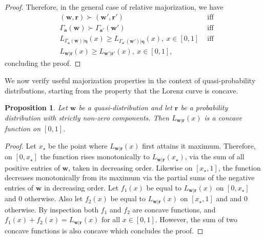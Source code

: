 \documentclass[
twocolumn,
superscriptaddress
]{revtex4-1}
\newtheorem{proposition}[theorem]{Proposition}
\def\bmeta{\boldsymbol{\eta}}
\def\bma{\boldsymbol{a}}
\def\r{\boldsymbol{r}}
\def\w{\boldsymbol{w}}
\begin{document}
{\begin{proof}
Therefore, in the general case of relative majorization, we have
\begin{align}
	&(\w, \r) \succ (\w', \r') &\mbox{ iff} \nonumber\\
	&\Gamma_{\bma} (\w) \succ \Gamma_{\bma'} (\w') &\mbox{ iff} \nonumber\\
	&L_{\Gamma_{\bma} (\w) | \bmeta}(x) \geq L_{\Gamma_{\bma'} (\w') | \bmeta}(x),\ x \in [0,1] &\mbox{ iff} \nonumber\\
	&L_{\w | \r}(x) \geq L_{\w' | \r'}(x),\ x \in [0,1],
\end{align}
concluding the proof.
\end{proof}
}

We now verify useful majorization properties in the context of quasi-probability distributions, starting from the property that the Lorenz curve is concave.
\begin{proposition}\label{L-concave} 
	Let $\w$ be a quasi-distribution and let $\r$ be a probability distribution with strictly non-zero components. Then $L_{\w|\r}(x)$ is a concave function on $[0,1]$.
\end{proposition}
\begin{proof} 
	Let $x_\star$ be the point where $L_{\w|\r}(x)$ first attains it maximum. Therefore, on $[0,x_\star]$ the function rises monotonically to $L_{\w|\r}(x_\star)$, via the sum of all positive entries of $\w$, taken in decreasing order. Likewise on $[x_\star, 1]$, the function decreases monotonically from its maximum via the partial sums of the negative entries of $\w$ in decreasing order. Let $f_1(x)$ be equal to $L_{\w|\r}(x)$ on $[0, x_\star]$ and $0$ otherwise. Also let $f_2(x)$ be equal to $L_{\w|\r}(x)$ on $[x_\star,1]$ and and $0$ otherwise. By inspection both $f_1$ and $f_2$ are concave functions, and $f_1(x) + f_2 (x) = L_{\w|\r}(x)$ for all $x\in [0,1]$. However, the sum of two concave functions is also concave which concludes the proof.
\end{proof}
\end{document}

